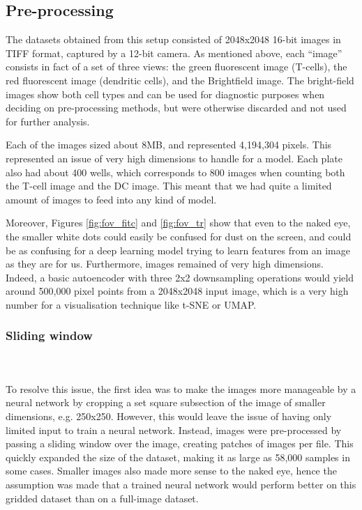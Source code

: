 \subsection{Pre-processing} \label{subsec:preproc}
The datasets obtained from this setup consisted of 2048x2048 16-bit images in TIFF format, captured by a 12-bit camera. As mentioned above, each ``image” consists in fact of a set of three views: the green fluorescent image (T-cells), the red fluorescent image (dendritic cells), and the Brightfield image. The bright-field images show both cell types and can be used for diagnostic purposes when deciding on pre-processing methods, but were otherwise discarded and not used for further analysis.

Each of the images sized about 8MB, and represented 4,194,304 pixels. This represented an issue of very high dimensions to handle for a model. Each plate also had about 400 wells, which corresponds to 800 images when counting both the T-cell image and the DC image. This meant that we had quite a limited amount of images to feed into any kind of model.

Moreover, Figures \ref{fig:fov_fitc} and \ref{fig:fov_tr} show that even to the naked eye, the smaller white dots could easily be confused for dust on the screen, and could be as confusing for a deep learning model trying to learn features from an image as they are for us. Furthermore, images remained of very high dimensions. Indeed, a basic autoencoder with three 2x2 downsampling operations would yield around 500,000 pixel points from a 2048x2048 input image, which is a very high number for a visualisation technique like t-SNE or UMAP.

\bigskip
\subsubsection{Sliding window}

\hfill\\
\hfill\\
To resolve this issue, the first idea was to make the images more manageable by a neural network by cropping a set square subsection of the image of smaller dimensions, e.g. 250x250. However, this would leave the issue of having only limited input to train a neural network. Instead, images were pre-processed by passing a sliding window over the image, creating patches of images per file. This quickly expanded the size of the dataset, making it as large as 58,000 samples in some cases. Smaller images also made more sense to the naked eye, hence the assumption was made that a trained neural network would perform better on this gridded dataset than on a full-image dataset.

